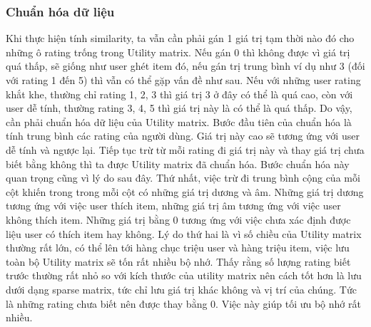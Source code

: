 \subsubsection{Chuẩn hóa dữ liệu}
Khi thực hiện tính similarity, ta vẫn cần phải gán 1 giá trị tạm thời nào đó cho những ô rating trống trong Utility matrix. Nếu gán 0 thì không được vì giá trị quá thấp, sẽ giống như user ghét item đó, nếu gán trị trung bình ví dụ như 3 (đối với rating 1 đến 5) thì vẫn có thể gặp vấn đề như sau. Nếu với những user rating khắt khe, thường chỉ rating 1, 2, 3 thì giá trị 3 ở đây có thể là quá cao, còn với user dễ tính, thường rating 3, 4, 5 thì giá trị này là có thể là quá thấp. Do vậy, cần phải chuẩn hóa dữ liệu của Utility matrix.
\newline Bước đầu tiên của chuẩn hóa là tính trung bình các rating của người dùng. Giá trị này cao sẽ tương ứng với user dễ tính và ngược lại. Tiếp tục trừ từ mỗi rating đi giá trị này và thay giá trị chưa biết bằng không thì ta được Utility matrix đã chuẩn hóa. Bước chuẩn hóa này quan trọng cũng vì lý do sau đây. Thứ nhất, việc trừ đi trung bình cộng của mỗi cột khiến trong trong mỗi cột có những giá trị dương và âm. Những giá trị dương tương ứng với việc user thích item, những giá trị âm tương ứng với việc user không thích item. Những giá trị bằng 0 tương ứng với việc chưa xác định được liệu user có thích item hay không. Lý do thứ hai là vì số chiều của Utility matrix thường rất lớn, có thể lên tới hàng chục triệu user và hàng triệu item, việc lưu toàn bộ Utility matrix sẽ tốn rất nhiều bộ nhớ. Thấy rằng số lượng rating biết trước thường rất nhỏ so với kích thước của utility matrix nên cách tốt hơn là lưu dưới dạng sparse matrix, tức chỉ lưu giá trị khác không và vị trí của chúng. Tức là những rating chưa biết nên được thay bằng 0. Việc này giúp tối ưu bộ nhớ rất nhiều.

